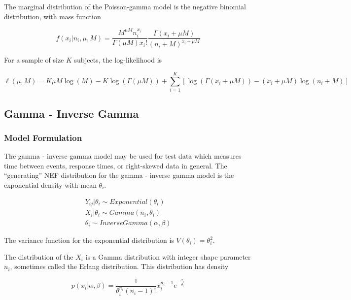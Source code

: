 \documentclass[12pt,epsfig]{article}
\begin{document}
The marginal distribution of the Poisson-gamma model is the negative binomial distribution, with mass function

\begin{equation*}
    f(x_i | n_i, \mu, M) = \dfrac{M^{\mu M}n_i^{x_i}}{\Gamma(\mu M) x_i !} \dfrac{\Gamma(x_i + \mu M)}{(n_i + M)^{x_i + \mu M}}
\end{equation*}

For a sample of size $K$ subjects, the log-likelihood is

\begin{equation*}
    \ell(\mu, M) =  K \mu M \log(M) - K \log(\Gamma(\mu M)) + \displaystyle \sum_{i = 1}^K \left[\log(\Gamma(x_i + \mu M)) - (x_i + \mu M) \log(n_i + M)\right]
\end{equation*}


\subsection{Gamma - Inverse Gamma}

\subsubsection{Model Formulation}

The gamma - inverse gamma model may be used for test data which measures time between events, response times, or right-skewed data in general. The ``generating'' NEF distribution for the gamma - inverse gamma model is the exponential density with mean $\theta_i$.

\begin{gather*}
    Y_{ij} | \theta_i \sim Exponential(\theta_i)\\
    X_{i} | \theta_i \sim Gamma(n_i, \theta_i)\\
    \theta_i \sim Inverse Gamma(\alpha, \beta)
\end{gather*}

\noindent The variance function for the exponential distribution is $V(\theta_i) = \theta_i^2$.

The distribution of the $X_i$ is a Gamma distribution with integer shape parameter $n_i$, sometimes called the Erlang distribution. This distribution has density

\begin{equation*}
    p(x_i | \alpha, \beta) = \dfrac{1}{\theta_i^{n_i} (n_i - 1)!} x_i^{n_i-1} e^{-\frac{x_i}{\theta_i}}
\end{equation*}
\end{document}
